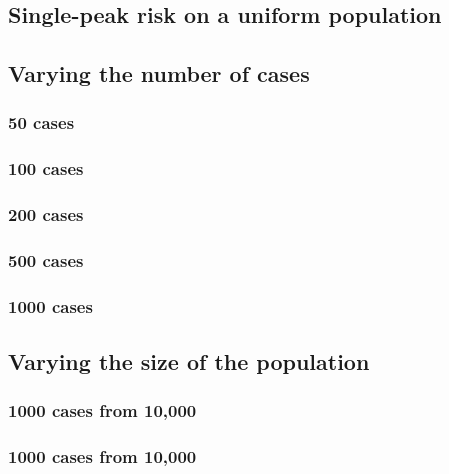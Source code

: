 \subsection{Single-peak risk on a uniform population}


\subsection{Varying the number of cases}

\subsubsection{50 cases}


\subsubsection{100 cases}


\subsubsection{200 cases}


\subsubsection{500 cases}


\subsubsection{1000 cases}


\subsection{Varying the size of the population}

\subsubsection{1000 cases from 10,000}


\subsubsection{1000 cases from 10,000}


